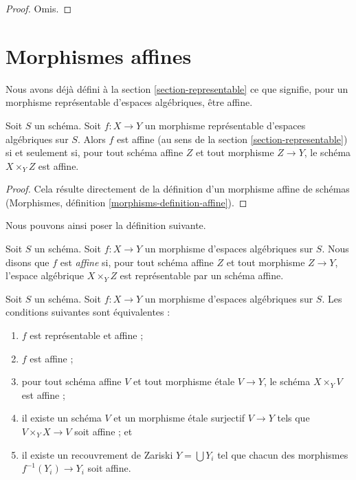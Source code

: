 \begin{proof}
Omis.
\end{proof}











\section{Morphismes affines}
\label{section-affine}

\noindent
Nous avons déjà défini à la section \ref{section-representable}
ce que signifie, pour un morphisme représentable d'espaces algébriques,
être affine.

\begin{lemma}
\label{lemma-affine-representable}
Soit $S$ un schéma. Soit $f : X \to Y$ un morphisme représentable
d'espaces algébriques sur $S$. Alors
$f$ est affine (au sens de la section \ref{section-representable})
si et seulement si, pour tout schéma affine $Z$
et tout morphisme $Z \to Y$, le schéma $X \times_Y Z$ est affine.
\end{lemma}

\begin{proof}
Cela résulte directement de la définition d'un morphisme affine de schémas
(Morphismes, définition \ref{morphisms-definition-affine}).
\end{proof}

\noindent
Nous pouvons ainsi poser la définition suivante.

\begin{definition}
\label{definition-affine}
Soit $S$ un schéma.
Soit $f : X \to Y$ un morphisme d'espaces algébriques sur $S$.
Nous disons que $f$ est {\it affine} si, pour tout schéma affine $Z$ et tout
morphisme $Z \to Y$, l'espace algébrique $X \times_Y Z$ est représentable
par un schéma affine.
\end{definition}

\begin{lemma}
\label{lemma-affine-local}
Soit $S$ un schéma.
Soit $f : X \to Y$ un morphisme d'espaces algébriques sur $S$.
Les conditions suivantes sont équivalentes :
\begin{enumerate}
\item $f$ est représentable et affine ;
\item $f$ est affine ;
\item pour tout schéma affine $V$ et tout morphisme étale $V \to Y$,
le schéma $X \times_Y V$ est affine ;
\item il existe un schéma $V$ et un morphisme étale surjectif
$V \to Y$ tels que $V \times_Y X \to V$ soit affine ; et
\item il existe un recouvrement de Zariski $Y = \bigcup Y_i$ tel
que chacun des morphismes $f^{-1}(Y_i) \to Y_i$ soit affine.
\end{enumerate}
\end{lemma}

